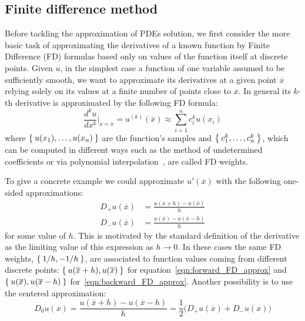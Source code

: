 
\subsection{Finite difference method}

Before tackling the approximation of PDEs solution, we first consider the more basic task of approximating the derivatives of a known function by Finite Difference (FD) formulas based only on values of the function itself at discrete points. Given $u$, in the simplest case a function of one variable assumed to be sufficiently smooth, we want to approximate its derivatives at a given point $\overline{x}$ relying solely on its values at a finite number of points close to $\overline{x}$. In general its $k$-th derivative is approximated by the following FD formula:
\begin{equation}
	\frac{d^k u}{dx^k}\bigg|_{x=\overline{x}} = u^{(k)}(\overline{x}) \approx \sum_{i=1}^{n} c_{i}^{k} u(x_i)
\end{equation}
where $\Set{u(x_1), \dots, u(x_n)}$ are the function's samples and $\Set{c_{1}^{k}, \dots, c_{n}^{k}}$, which can be computed in different ways such as the method of undetermined coefficients or via polynomial interpolation~\cite{LeVeque:FD_book}, are called FD weights.

To give a concrete example we could approximate $u'(\overline{x})$ with the following one-sided approximations:
\begin{subequations}
	\begin{align}
		D_+ u(\overline{x}) & = \frac{u(\overline{x}+h) - u(\overline{x})}{h}  \label{eqn:forward_FD_approx}\\
		D_- u(\overline{x}) & = \frac{u(\overline{x}) - u(\overline{x}-h)}{h}  \label{eqn:backward_FD_approx}
	\end{align}
\end{subequations}
for some value of $ h$. This is motivated by the standard definition of the derivative as the limiting value of this expression as $h \to 0$. In these cases the same FD weights, $\Set{1/h, - 1/h}$, are associated to function values coming from different discrete points: $\Set{u(\overline{x}+h), u(\overline{x})}$ for equation~\eqref{eqn:forward_FD_approx} and $\Set{u(\overline{x}), u(\overline{x}-h)}$ for~\eqref{eqn:backward_FD_approx}. Another possibility is to use the centered approximation:
\begin{equation}
	D_0 u(\overline{x}) = \frac{u(\overline{x}+h) - u(\overline{x}-h)}{h} = \frac{1}{2} \bigl( D_+ u(\overline{x}) + D_- u(\overline{x}) \bigr)
\end{equation}

